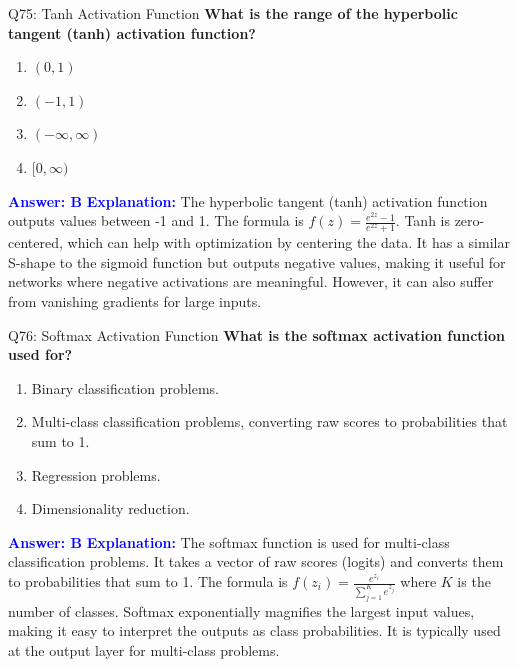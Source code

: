 \documentclass[8pt]{beamer}
\begin{document}
	\begin{frame}{Q75: Tanh Activation Function}
		\fontsize{6.5}{7.5}\selectfont
		\textbf{What is the range of the hyperbolic tangent (tanh) activation function?}
		\begin{enumerate}
			\item $(0, 1)$
			\item $(-1, 1)$
			\item $(-\infty, \infty)$
			\item $[0, \infty)$
		\end{enumerate}
		\vspace{0.1cm}
		\textcolor{blue}{\textbf{Answer: B}}
		\vspace{0.1cm}
		\textcolor{blue}{\textbf{Explanation:}} The hyperbolic tangent (tanh) activation function outputs values between -1 and 1. The formula is $f(z) = \frac{e^{2z} - 1}{e^{2z} + 1}$. Tanh is zero-centered, which can help with optimization by centering the data. It has a similar S-shape to the sigmoid function but outputs negative values, making it useful for networks where negative activations are meaningful. However, it can also suffer from vanishing gradients for large inputs.
	\end{frame}
	
	\begin{frame}{Q76: Softmax Activation Function}
		\fontsize{6.5}{7.5}\selectfont
		\textbf{What is the softmax activation function used for?}
		\begin{enumerate}
			\item Binary classification problems.
			\item Multi-class classification problems, converting raw scores to probabilities that sum to 1.
			\item Regression problems.
			\item Dimensionality reduction.
		\end{enumerate}
		\vspace{0.1cm}
		\textcolor{blue}{\textbf{Answer: B}}
		\vspace{0.1cm}
		\textcolor{blue}{\textbf{Explanation:}} The softmax function is used for multi-class classification problems. It takes a vector of raw scores (logits) and converts them to probabilities that sum to 1. The formula is $f(z_i) = \frac{e^{z_i}}{\sum_{j=1}^K e^{z_j}}$ where $K$ is the number of classes. Softmax exponentially magnifies the largest input values, making it easy to interpret the outputs as class probabilities. It is typically used at the output layer for multi-class problems.
	\end{frame}
	
\end{document}

